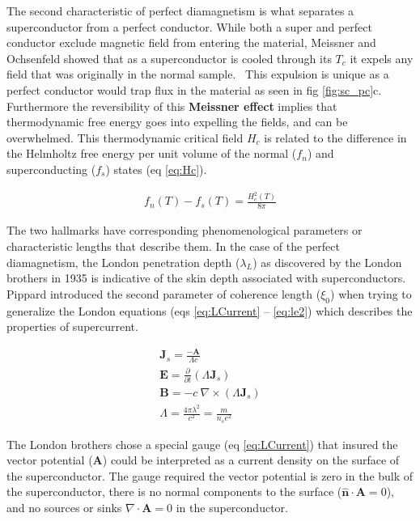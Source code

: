 \documentclass[
reprint,
amsmath,amssymb,
aps,
tikz,
border=5pt
]{revtex4-1}
\begin{document}
    The second characteristic of perfect diamagnetism is what separates a superconductor from a perfect conductor. While both a super and perfect conductor exclude magnetic field from entering the material, Meissner and Ochsenfeld showed that as a superconductor is cooled through its $T_c$ it expels any field that was originally in the normal sample.~\cite{MnO1933,tinkham} This expulsion is unique as a perfect conductor would trap flux in the material as seen in fig \ref{fig:sc_pc}c. Furthermore the reversibility of this \textbf{Meissner effect} implies that thermodynamic free energy goes into expelling the fields, and can be overwhelmed. This thermodynamic critical field  $H_c$ is related to the difference in the Helmholtz free energy per unit volume of the normal ($f_n$) and superconducting ($f_s$) states (eq \ref{eq:Hc}).
    
    \begin{gather}
      f_n(T) - f_s(T) = \frac{H_c^2(T)}{8\pi}
      \label{eq:Hc} 
    \end{gather}

    The two hallmarks have corresponding phenomenological parameters or characteristic lengths that describe them. In the case of the perfect diamagnetism, the London penetration depth ($\lambda_L$) as discovered by the London brothers in 1935 is indicative of the skin depth associated with superconductors. Pippard introduced the second parameter of coherence length ($\xi_0$) when trying to generalize the London  equations (eqs \ref{eq:LCurrent} -- \ref{eq:le2}) which describes the properties of supercurrent.~\cite{tinkham, pippard}

    \begin{gather}
      \mathbf{J}_s = \frac{-\mathbf{A}}{\Lambda c}
      \label{eq:LCurrent}\\
      \mathbf{E} = \frac{\partial}{\partial t}(\Lambda \mathbf{J}_s)  
      \label{eq:le1} \\
      \mathbf{B} = -c ~\nabla \times (\Lambda \mathbf{J}_s)  
      \label{eq:le2} \\
      \Lambda = \frac{4\pi \lambda^2}{c^2}  = \frac{m}{n_s e^2}
    \end{gather}

    The London brothers chose a special gauge (eq \ref{eq:LCurrent}) that insured the vector potential ($\mathbf{A}$) could be interpreted as a current density on the surface of the superconductor. The gauge required the vector potential is zero in the bulk of the superconductor, there is no normal components to the surface ($\hat{\mathbf{n}}\cdot \mathbf{A} = 0$), and no sources or sinks $\nabla \cdot \mathbf{A} = 0$ in the superconductor. 
\end{document}
